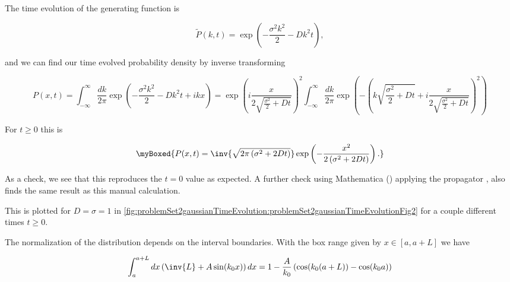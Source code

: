 {The time evolution of the generating function is

\begin{dmath}\label{eqn:basicStatMechProblemSet2Problem1:300}
\tilde{P}(k, t)
=
\exp\left(
-\frac{\sigma^2 k^2}{2} - D k^2 t
\right),
\end{dmath}

and we can find our time evolved probability density by inverse transforming

\begin{dmath}\label{eqn:basicStatMechProblemSet2Problem1:320}
P(x, t)
=
\int_{-\infty}^\infty \frac{dk}{2 \pi}
\exp\left(
-\frac{\sigma^2 k^2}{2} - D k^2 t + i k x
\right)
=
\exp\left(
i \frac{x}{ 2 \sqrt{\frac{\sigma^2}{2} + D t} }
\right)^2
\int_{-\infty}^\infty \frac{dk}{2 \pi}
\exp\left(
-\left(
k \sqrt{\frac{\sigma^2}{2} + D t}
+ i \frac{x}{ 2
\sqrt{\frac{\sigma^2}{2} + D t}
}
\right)^2
\right)
\end{dmath}

For $t \ge 0$ this is

\begin{equation}\label{eqn:basicStatMechProblemSet2Problem1:340}
\myBoxed
{
P(x, t)
=
\inv{\sqrt{2 \pi \left( \sigma^2 + 2 D t \right) } }
\exp\left(
-\frac{x^2}{2 \left( \sigma^2 + 2 D t \right) }
\right).
}
\end{equation}

As a check, we see that this reproduces the $t = 0$ value as expected.  A further check using Mathematica () applying the propagator , also finds the same result as this manual calculation.

This is plotted for $D = \sigma = 1$ in \cref{fig:problemSet2gaussianTimeEvolution:problemSet2gaussianTimeEvolutionFig2} for a couple different times $t \ge 0$.



The normalization of the distribution depends on the interval boundaries.  With the box range given by $x \in [a, a + L]$ we have

\begin{equation}\label{eqn:basicStatMechProblemSet2Problem1:380}
\int_a^{a + L} dx \left( \inv{L} + A \sin( k_0 x) \right) dx
=
1 - \frac{A}{k_0} \left( \cos( k_0(a + L) ) - \cos( k_0 a ) \right)
\end{equation}

}
